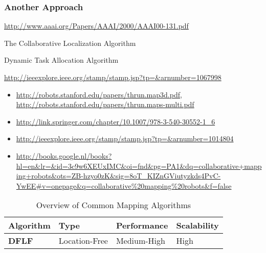 \subsubsection{Another Approach}
\url{http://www.aaai.org/Papers/AAAI/2000/AAAI00-131.pdf}

The Collaborative Localization Algorithm

Dynamic Task Allocation Algorithm

\url{http://ieeexplore.ieee.org/stamp/stamp.jsp?tp=&arnumber=1067998}


\begin{itemize}
  \item \url{http://robots.stanford.edu/papers/thrun.map3d.pdf}, \url{http://robots.stanford.edu/papers/thrun.maps-multi.pdf}
  \item \url{http://link.springer.com/chapter/10.1007/978-3-540-30552-1_6}
  \item \url{http://ieeexplore.ieee.org/stamp/stamp.jsp?tp=&arnumber=1014804}
  \item \url{http://books.google.nl/books?hl=en&lr=&id=3c9w6XEUxIMC&oi=fnd&pg=PA1&dq=collaborative+mapping+robots&ots=ZB-hzyo0zK&sig=8oT_KIZnGViutyzkds4PvC-YwEE#v=onepage&q=collaborative%20mapping%20robots&f=false}
\end{itemize}

  \begin{table}[H]
  \renewcommand{\arraystretch}{1.3}
  \label{table_alg_mapping}
  \caption{Overview of Common Mapping Algorithms}
  \centering
    \begin{tabular}{|l|l|l|l|}
    \hline
    \bfseries Algorithm & \bfseries Type & \bfseries Performance & \bfseries Scalability\\
    \hline
    \bfseries DFLF& Location-Free & Medium-High & High\\\hline
    \end{tabular}
  \end{table}

